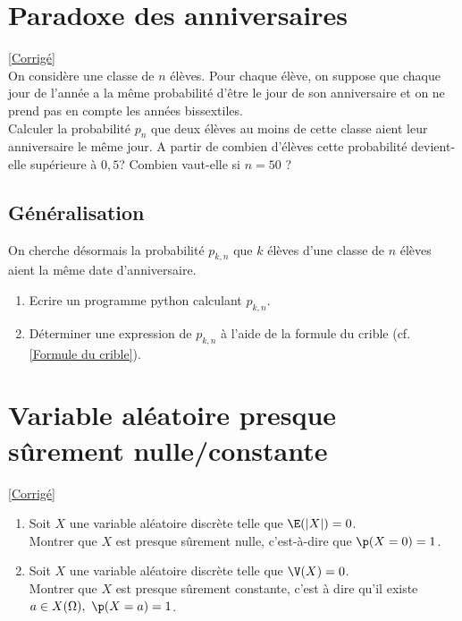 \documentclass[8pt]{book}
\begin{document}
\section{Paradoxe des anniversaires }
\label{Paradoxe des anniversaires}
\textcolor{blue}{\hyperref[Paradoxe des anniversaires corrigé]{[Corrigé]}}\\
On considère une classe de $n$ élèves. Pour chaque élève, on suppose que chaque jour de l'année a la même probabilité d'être le jour de son anniversaire et on ne prend pas en compte les années bissextiles.
\\Calculer la probabilité $p_n$ que deux élèves au moins de cette classe aient leur anniversaire le même jour. A partir de combien d'élèves cette probabilité devient-elle supérieure à $0,5$? Combien vaut-elle si $n=50$ ?

\subsection{Généralisation }
On cherche désormais la probabilité $p_{k,n}$ que $k$ élèves d'une classe de $n$ élèves aient la même date d'anniversaire.
\begin{enumerate}
	\item Ecrire un programme python calculant $p_{k,n}$.
	\item Déterminer une expression de $p_{k,n}$ à l'aide de la formule du crible (cf. \ref{Formule du crible}).
\end{enumerate}

\section{Variable aléatoire presque sûrement nulle/constante }
\label{Variable aléatoire presque sûrement nulle/constante}
\textcolor{blue}{\hyperref[Variable aléatoire presque sûrement nulle/constante]{[Corrigé]}}\\
\begin{enumerate}
	\item Soit $X$ une variable aléatoire discrète telle que $\E(|X|)=0$. 
	\\Montrer que $X$ est presque sûrement nulle, c'est-à-dire que $\p(X=0)=1$.
	\item Soit $X$ une variable aléatoire discrète telle que $\V(X)=0$.\\
	Montrer que $X$ est presque sûrement constante, c'est à dire qu'il existe $a\in X(\Omega),\ \p(X=a)=1$.
\end{enumerate}
\end{document}
